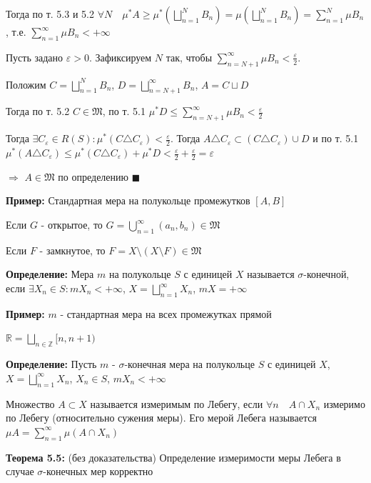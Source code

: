 \documentclass[a4paper]{report}
\begin{document}
Тогда по т. 5.3 и 5.2 $\forall N\quad\mu^*A\ge\mu^*(\bigsqcup\limits_{n=1}^N B_n)=\mu(\bigsqcup\limits_{n=1}^N B_n)=
\sum\limits_{n=1}^N\mu B_n$, т.е. $\sum\limits_{n=1}^\infty \mu B_n<+\infty$

Пусть задано $\varepsilon>0$. Зафиксируем $N$ так, чтобы $\sum\limits_{n=N+1}^\infty\mu B_n<\frac\varepsilon 2$. 

Положим $C=\bigsqcup\limits_{n=1}^N B_n$, $D=\bigsqcup\limits_{n=N+1}^\infty B_n$, $A=C\sqcup D$

Тогда по т. 5.2 $C\in\mathfrak M$, по т. 5.1 $\mu^*D\le\sum\limits_{n=N+1}^\infty\mu B_n<\frac\varepsilon2$

Тогда $\exists C_\varepsilon\in R(S)\colon\mu^*(C\triangle C_\varepsilon)<\frac\varepsilon 2$. Тогда $A\triangle C_\varepsilon\subset
(C\triangle C_\varepsilon)\cup D$ и по т. 5.1 $\mu^*(A\triangle C_\varepsilon)\le\mu^*(C\triangle C_\varepsilon)+\mu^*D<
\frac\varepsilon2+\frac\varepsilon2=\varepsilon$

$\Rightarrow$ $A\in\mathfrak M$ по определению $\blacksquare$
\bigskip

\noindent\textbf{Пример:} Стандартная мера на полукольце промежутков $[A,B]$

Если $G$ - открытое, то $G=\bigcup\limits_{n=1}^\infty(a_n,b_n)\in\mathfrak M$

Если $F$ - замкнутое, то $F=X\setminus(X\setminus F)\in\mathfrak M$
\bigskip

\noindent\textbf{Определение:} Мера $m$ на полукольце $S$ с единицей $X$ называется $\sigma$-конечной, если $\exists 
X_n\in S\colon mX_n<+\infty$, $X=\bigsqcup\limits_{n=1}^\infty X_n$, $mX=+\infty$
\bigskip

\noindent\textbf{Пример:} $m$ - стандартная мера на всех промежутках прямой 

$\mathbb R=\bigsqcup\limits_{n\in\mathbb Z}[n,n+1)$
\bigskip

\noindent\textbf{Определение:} Пусть $m$ - $\sigma$-конечная мера на полукольце  $S$ с единицей $X$, $X=\bigsqcup
\limits_{n=1}^\infty X_n$, $X_n\in S$, $mX_n<+\infty$

Множество $A\subset X$ называется измеримым по Лебегу, если $\forall n\quad A\cap X_n$ измеримо по Лебегу (относительно 
сужения меры). Его мерой Лебега называется $\mu A=\sum\limits_{n=1}^\infty\mu(A\cap X_n)$
\bigskip

\noindent\textbf{Теорема 5.5:} (без доказательства) Определение измеримости меры Лебега в случае $\sigma$-конечных мер 
корректно
\end{document}
